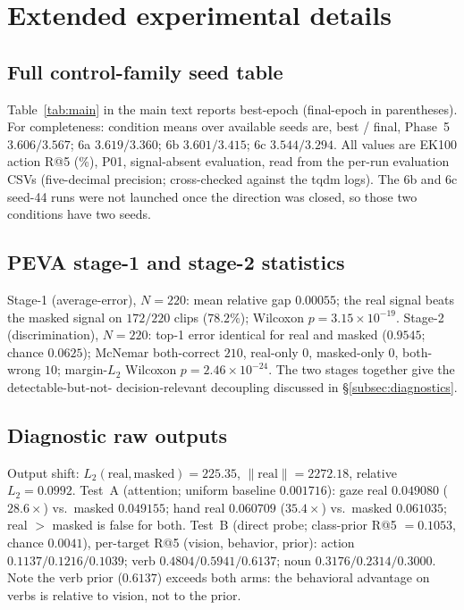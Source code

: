\section{Extended experimental details}
\label{sec:extended}

\subsection{Full control-family seed table}
Table~\ref{tab:main} in the main text reports best-epoch (final-epoch in
parentheses). For completeness: condition means over available seeds are, best /
final, Phase~5 $3.606 / 3.567$; 6a $3.619 / 3.360$; 6b $3.601 / 3.415$; 6c
$3.544 / 3.294$. All values are EK100 action R@5 (\%), P01, signal-absent
evaluation, read from the per-run evaluation CSVs (five-decimal precision;
cross-checked against the tqdm logs). The 6b and 6c seed-44 runs were not
launched once the direction was closed, so those two conditions have two seeds.

\subsection{PEVA stage-1 and stage-2 statistics}
Stage-1 (average-error), $N=220$: mean relative gap $0.00055$; the real signal
beats the masked signal on $172/220$ clips ($78.2\%$); Wilcoxon
$p = 3.15\times10^{-19}$. Stage-2 (discrimination), $N=220$: top-1 error
identical for real and masked ($0.9545$; chance $0.0625$); McNemar both-correct
$210$, real-only $0$, masked-only $0$, both-wrong $10$; margin-$L_2$ Wilcoxon
$p = 2.46\times10^{-24}$. The two stages together give the detectable-but-not-
decision-relevant decoupling discussed in \S\ref{subsec:diagnostics}.

\subsection{Diagnostic raw outputs}
Output shift: $L_2(\text{real},\text{masked}) = 225.35$, $\lVert\text{real}\rVert
= 2272.18$, relative $L_2 = 0.0992$. Test~A (attention; uniform baseline
$0.001716$): gaze real $0.049080$ ($28.6\times$) vs.\ masked $0.049155$; hand
real $0.060709$ ($35.4\times$) vs.\ masked $0.061035$; real $>$ masked is false
for both. Test~B (direct probe; class-prior R@5 $= 0.1053$, chance $0.0041$),
per-target R@5 (vision, behavior, prior): action $0.1137 / 0.1216 / 0.1039$;
verb $0.4804 / 0.5941 / 0.6137$; noun $0.3176 / 0.2314 / 0.3000$. Note the verb
prior ($0.6137$) exceeds both arms: the behavioral advantage on verbs is relative
to vision, not to the prior.

